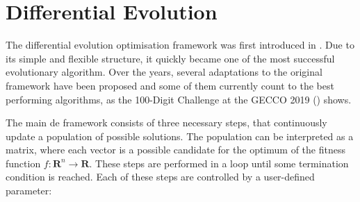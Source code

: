 \documentclass[./\jobname.tex,hidelinks]{subfiles}
\begin{document}
\section{Differential Evolution}

The differential evolution optimisation framework was first introduced in \cite{storn_differential_1997}. Due to its simple and flexible structure, it quickly became one of the most successful evolutionary algorithm. Over the years, several adaptations to the original framework have been proposed and some of them currently count to the best performing algorithms, as the 100-Digit Challenge at the GECCO 2019 (\cite{suganthan_p-n-suganthancec2019_2020}) shows. 

The main \gls{de} framework consists of three necessary steps, that continuously update a population of possible solutions. The population can be interpreted as a matrix, where each vector is a possible candidate for the optimum of the fitness function $f: \mathbf{R}^n \rightarrow \mathbf{R}$. These steps are performed in a loop until some termination condition is reached. Each of these steps are controlled by a user-defined parameter: 
\end{document}
